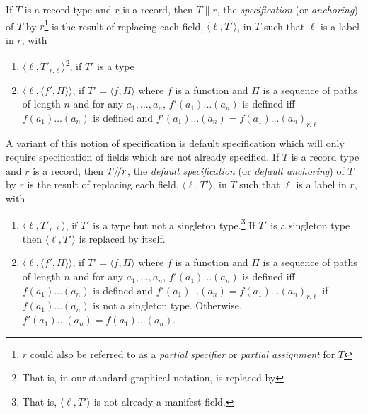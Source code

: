 If $T$ is a record type and $r$ is a record, then $T\parallel r$, the
\textit{specification} (or \textit{anchoring}) of $T$ by
$r$\footnote{$r$ could also be referred to as a \textit{partial
    specifier} or \textit{partial assignment} for $T$} is the result
of replacing each field, $\langle \ell, T'\rangle$, in $T$ such that
$\ell$ is a label in $r$, with 
\begin{enumerate}
\item  $\langle\ell,T'_{r.\ell}\rangle$\footnote{That is, in our
standard graphical notation,  is
replaced by }, if
$T'$ is a type
\item $\langle\ell,\langle f',\Pi\rangle\rangle$, if $T'=\langle
  f,\Pi\rangle$ where $f$ is a function and $\Pi$ is a sequence of
  paths of length $n$ and for any
  $a_1,\ldots,a_n$, $f'(a_1)\ldots(a_n)$ is defined iff
  $f(a_1)\ldots(a_n)$ is defined and $f'(a_1)\ldots(a_n) =
  f(a_1)\ldots(a_n)_{r.\ell}$
\end{enumerate}

A variant of this notion of specification is default specification
which will only require specification of fields which are not already
specified. If $T$ is a record type and $r$ is a record, then
$T/\!/ r$, the
\textit{default specification} (or \textit{default anchoring}) of $T$ by
$r$ is the result
of replacing each field, $\langle \ell, T'\rangle$, in $T$ such that
$\ell$ is a label in $r$, with 
\begin{enumerate}
\item  $\langle\ell,T'_{r.\ell}\rangle$, if
$T'$ is a type but not a singleton type.\footnote{That is, $\langle
  \ell, T'\rangle$ is not already a manifest field.} If $T'$ is a
singleton type then $\langle \ell, T'\rangle$ is replaced by itself.
\item $\langle\ell,\langle f',\Pi\rangle\rangle$, if $T'=\langle
  f,\Pi\rangle$ where $f$ is a function and $\Pi$ is a sequence of
  paths of length $n$ and for any
  $a_1,\ldots,a_n$, $f'(a_1)\ldots(a_n)$ is defined iff
  $f(a_1)\ldots(a_n)$ is defined and $f'(a_1)\ldots(a_n) =
  f(a_1)\ldots(a_n)_{r.\ell}$ if $f(a_1)\ldots(a_n)$ is not a
  singleton type. Otherwise, $f'(a_1)\ldots(a_n) =
  f(a_1)\ldots(a_n)$.
\end{enumerate}  

